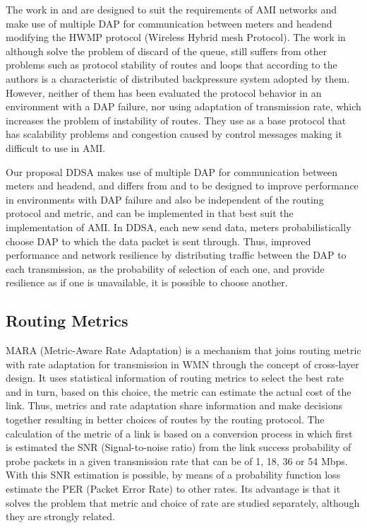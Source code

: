 \documentclass[conference]{IEEEtran}
\begin{document}
The work in \cite{6412861} and \cite{Gharavi2011} are designed to suit the requirements of AMI networks and make use of multiple DAP for communication between meters and headend modifying the HWMP protocol (Wireless Hybrid mesh Protocol). The work in \cite{Gharavi2011} although solve the problem of discard of the queue, still suffers from other problems such as protocol stability of routes and loops that according to the authors is a characteristic of distributed backpressure system adopted by them. However, neither of them has been evaluated the protocol behavior in an environment with a DAP failure, nor using adaptation of transmission rate, which increases the problem of instability of routes. They use as a base protocol that has scalability problems and congestion caused by control messages \cite{5473885} making it difficult to use in AMI.


Our proposal DDSA makes use of multiple DAP for communication between meters and headend, and differs from \cite{6412861} and \cite{Gharavi2011} to be designed to improve performance in environments with DAP failure and also be independent of the routing protocol and metric, and can be implemented in that best suit the implementation of AMI.
In DDSA, each new send data, meters probabilistically choose DAP to which the data packet is sent through. 
Thus, improved performance and network resilience by distributing traffic between the DAP to each transmission, as the probability of selection of each one, and provide resilience as if one is unavailable, it is possible to choose another.


\subsection{Routing Metrics}
 

MARA (Metric-Aware Rate Adaptation) \cite{6051505} is a mechanism that joins routing metric with rate adaptation for transmission in WMN through the concept of cross-layer design.
It uses statistical information of routing metrics to select the best rate and in turn, based on this choice, the metric can estimate the actual cost of the link.
Thus, metrics and rate adaptation share information and make decisions together resulting in better choices of routes by the routing protocol.
The calculation of the metric of a link is based on a conversion process in which first is estimated the SNR (Signal-to-noise ratio) from the link success probability of probe packets in a given transmission rate that can be of 1, 18, 36 or 54 Mbps.
With this SNR estimation is possible, by means of a probability function loss estimate the PER (Packet Error Rate) to other rates. Its advantage is that it solves the problem that metric and choice of rate are studied separately, although they are strongly related.
\end{document}
